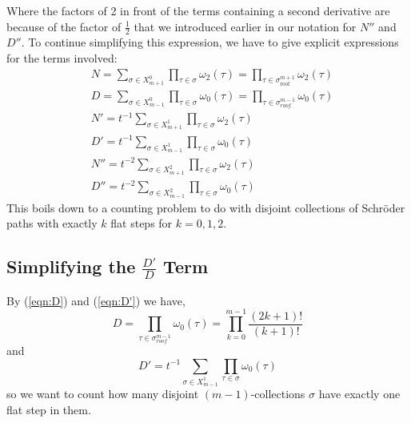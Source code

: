 \documentclass[11pt]{article}
\theoremstyle{mythm}
\begin{document}
Where the factors of 2 in front of the terms containing a second derivative are because of the factor of $\frac{1}{2}$ that we introduced earlier in our notation for $N''$ and $D''$. To continue simplifying this expression, we have to give explicit expressions for the terms involved:
\begin{align}
&N = \sum\limits_{\sigma\in X_{m+1}^0}\prod\limits_{\tau\in\sigma}\omega_2(\tau) = \prod\limits_{\tau\in\sigma_{\text{roof}}^{m+1}}\omega_2(\tau) \label{eqn:N} \\
&D = \sum\limits_{\sigma\in X_{m-1}^0}\prod\limits_{\tau\in\sigma}\omega_0(\tau) = \prod\limits_{\tau\in\sigma_{roof}^{m-1}}\omega_0(\tau) \label{eqn:D} \\
&N' = t^{-1}\sum\limits_{\sigma\in X_{m+1}^1}\prod\limits_{\tau\in\sigma}\omega_2(\tau) \label{eqn:N'} \\
&D' = t^{-1}\sum\limits_{\sigma\in X_{m-1}^1}\prod\limits_{\tau\in\sigma}\omega_0(\tau)  \label{eqn:D'} \\
&N'' = t^{-2}\sum\limits_{\sigma\in X_{m+1}^2}\prod\limits_{\tau\in\sigma}\omega_2(\tau) \label{eqn:N''} \\
&D'' = t^{-2}\sum\limits_{\sigma\in X_{m-1}^2}\prod\limits_{\tau\in\sigma}\omega_0(\tau) \label{eqn:D''}
\end{align}
This boils down to a counting problem to do with disjoint collections of Schröder paths with exactly $k$ flat steps for $k = 0,1,2$.

\subsection{Simplifying the $\frac{D'}{D}$ Term}

By (\ref{eqn:D}) and (\ref{eqn:D'}) we have,
\begin{equation*}
D = \prod\limits_{\tau\in\sigma_{roof}^{m-1}}\omega_0(\tau) = \prod\limits_{k=0}^{m-1}\frac{(2k+1)!}{(k+1)!}
\end{equation*}
and
\begin{equation*}
D' = t^{-1}\sum\limits_{\sigma\in X_{m-1}^1}\prod\limits_{\tau\in\sigma}\omega_0(\tau)
\end{equation*}
so we want to count how many disjoint $(m-1)$-collections $\sigma$ have exactly one flat step in them.
\end{document}
